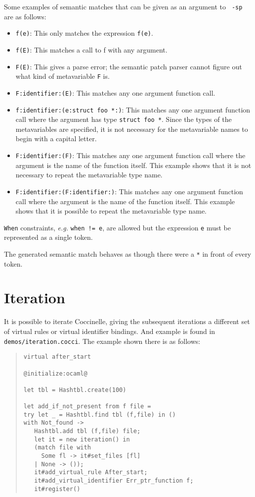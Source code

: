Some examples of semantic matches that can be given as an argument to {\tt
  -sp} are as follows:

\begin{itemize}
\item \texttt{f(e)}: This only matches the expression \texttt{f(e)}.
\item \texttt{f(E)}: This matches a call to f with any argument.
\item \texttt{F(E)}: This gives a parse error; the semantic patch parser
  cannot figure out what kind of metavariable \texttt{F} is.
\item \texttt{F:identifier:(E)}: This matches any one argument function
  call.
\item \texttt{f:identifier:(e:struct foo *:)}: This matches any one
  argument function call where the argument has type \texttt{struct foo
    *}.  Since the types of the metavariables are specified, it is not
  necessary for the metavariable names to begin with a capital letter.
\item \texttt{F:identifier:(F)}: This matches any one argument function call
  where the argument is the name of the function itself.  This example
  shows that it is not necessary to repeat the metavariable type name.
\item \texttt{F:identifier:(F:identifier:)}: This matches any one argument
  function call
  where the argument is the name of the function itself.  This example
  shows that it is possible to repeat the metavariable type name.
\end{itemize}

\texttt{When} constraints, \textit{e.g.} \texttt{when != e}, are allowed
but the expression \texttt{e} must be represented as a single token.

The generated semantic match behaves as though there were a \texttt{*} in front
of every token.

\section{Iteration}

It is possible to iterate Coccinelle, giving the subsequent iterations a
different set of virtual rules or virtual identifier bindings.  And example
is found in {\tt demos/iteration.cocci}.  The example shown there is as
follows:

\begin{quote}
\begin{verbatim}
virtual after_start

@initialize:ocaml@

let tbl = Hashtbl.create(100)

let add_if_not_present from f file =
try let _ = Hashtbl.find tbl (f,file) in ()
with Not_found ->
   Hashtbl.add tbl (f,file) file;
   let it = new iteration() in
   (match file with
     Some fl -> it#set_files [fl]
   | None -> ());
   it#add_virtual_rule After_start;
   it#add_virtual_identifier Err_ptr_function f;
   it#register()
\end{verbatim}
\end{quote}

